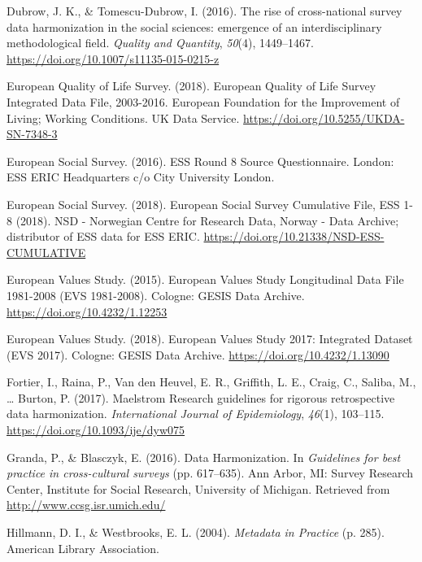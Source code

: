 \documentclass[12pt,]{article}
\begin{document}
\leavevmode\hypertarget{ref-Dubrow2016}{}%
Dubrow, J. K., \& Tomescu-Dubrow, I. (2016). The rise of cross-national survey data harmonization in the social sciences: emergence of an interdisciplinary methodological field. \emph{Quality and Quantity}, \emph{50}(4), 1449--1467. \url{https://doi.org/10.1007/s11135-015-0215-z}

\leavevmode\hypertarget{ref-EQLS2018}{}%
European Quality of Life Survey. (2018). European Quality of Life Survey Integrated Data File, 2003-2016. European Foundation for the Improvement of Living; Working Conditions. UK Data Service. \url{https://doi.org/10.5255/UKDA-SN-7348-3}

\leavevmode\hypertarget{ref-ESS2016b}{}%
European Social Survey. (2016). ESS Round 8 Source Questionnaire. London: ESS ERIC Headquarters c/o City University London.

\leavevmode\hypertarget{ref-ESS2018}{}%
European Social Survey. (2018). European Social Survey Cumulative File, ESS 1-8 (2018). NSD - Norwegian Centre for Research Data, Norway - Data Archive; distributor of ESS data for ESS ERIC. \url{https://doi.org/10.21338/NSD-ESS-CUMULATIVE}

\leavevmode\hypertarget{ref-EVS2015}{}%
European Values Study. (2015). European Values Study Longitudinal Data File 1981-2008 (EVS 1981-2008). Cologne: GESIS Data Archive. \url{https://doi.org/10.4232/1.12253}

\leavevmode\hypertarget{ref-EVS2018}{}%
European Values Study. (2018). European Values Study 2017: Integrated Dataset (EVS 2017). Cologne: GESIS Data Archive. \url{https://doi.org/10.4232/1.13090}

\leavevmode\hypertarget{ref-Fortier2017a}{}%
Fortier, I., Raina, P., Van den Heuvel, E. R., Griffith, L. E., Craig, C., Saliba, M., \ldots{} Burton, P. (2017). Maelstrom Research guidelines for rigorous retrospective data harmonization. \emph{International Journal of Epidemiology}, \emph{46}(1), 103--115. \url{https://doi.org/10.1093/ije/dyw075}

\leavevmode\hypertarget{ref-Granda2016}{}%
Granda, P., \& Blasczyk, E. (2016). Data Harmonization. In \emph{Guidelines for best practice in cross-cultural surveys} (pp. 617--635). Ann Arbor, MI: Survey Research Center, Institute for Social Research, University of Michigan. Retrieved from \url{http://www.ccsg.isr.umich.edu/}

\leavevmode\hypertarget{ref-Hillmann2004}{}%
Hillmann, D. I., \& Westbrooks, E. L. (2004). \emph{Metadata in Practice} (p. 285). American Library Association.
\end{document}

